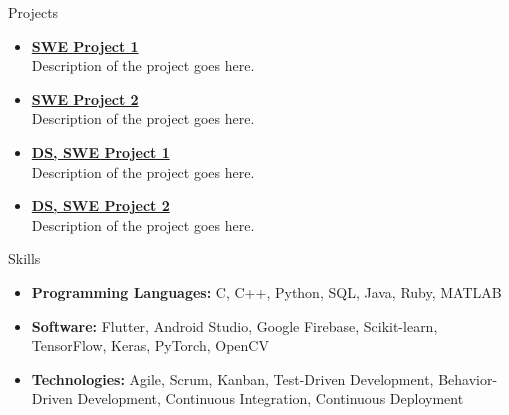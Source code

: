 \documentclass[]{../mcdowellcv}
\begin{document}
\begin{cvsection}{Projects}

    \begin{cvsubsection}{}{}{}
        \begin{itemize}
            \setlength\itemsep{3pt}
            \item\textbf{\href{https://github.com/johndoe/beepboop}{SWE Project 1}} \\
            Description of the project goes here.
        \end{itemize}
    \end{cvsubsection}
    
    \begin{cvsubsection}{}{}{}
        \begin{itemize}
            \setlength\itemsep{3pt}
            \item\textbf{\href{https://github.com/johndoe/beepboop}{SWE Project 2}} \\
            Description of the project goes here.
        \end{itemize}
    \end{cvsubsection}
    
    \begin{cvsubsection}{}{}{}
        \begin{itemize}
            \setlength\itemsep{3pt}
            \item\textbf{\href{https://github.com/johndoe/beepboop}{DS, SWE Project 1}} \\
            Description of the project goes here.
        \end{itemize}
    \end{cvsubsection}
    
    \begin{cvsubsection}{}{}{}
        \begin{itemize}
            \setlength\itemsep{3pt}
            \item\textbf{\href{https://github.com/johndoe/beepboop}{DS, SWE Project 2}} \\
            Description of the project goes here.
        \end{itemize}
    \end{cvsubsection}
    
\end{cvsection}

\begin{cvsection}{Skills}
    \begin{cvsubsection}{}{}{}
        \begin{itemize}
            \item \textbf{Programming Languages:} C, C++, Python, SQL, Java, Ruby, MATLAB
            \item \textbf{Software:} Flutter, Android Studio, Google Firebase, Scikit-learn, TensorFlow, Keras, PyTorch, OpenCV
            \item \textbf{Technologies:} Agile, Scrum, Kanban, Test-Driven Development, Behavior-Driven Development, Continuous Integration, Continuous Deployment
        \end{itemize}
    \end{cvsubsection}
\end{cvsection}
\end{document}
